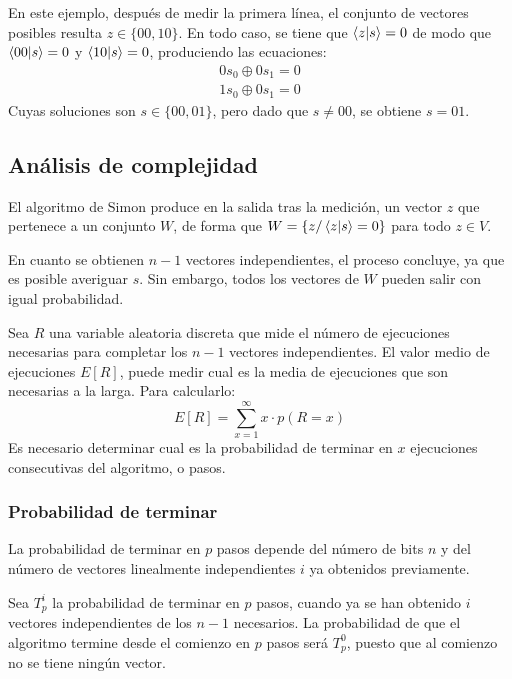 En este ejemplo, después de medir la primera línea, el conjunto de vectores 
posibles resulta $z \in \{00, 10\}$. En todo caso, se tiene que $\braket{z|s} = 
0$ de modo que $\braket{00|s} = 0$ y $\braket{10|s} = 0$, produciendo las 
ecuaciones:
%
\begin{equation}
\begin{split}
	0 s_0 \oplus 0 s_1 = 0 \\
	1 s_0 \oplus 0 s_1 = 0
\end{split}
\end{equation}
%
Cuyas soluciones son $s \in \{00, 01\}$, pero dado que $s \neq 00$, se obtiene 
$s = 01$.

\subsection{Análisis de complejidad}

El algoritmo de Simon produce en la salida tras la medición, un vector $z$ que 
pertenece a un conjunto $W$, de forma que $W = \{z / \braket{z|s} = 0\}$ para 
todo $z \in V$.

En cuanto se obtienen $n-1$ vectores independientes, el proceso concluye, ya que 
es posible averiguar $s$. Sin embargo, todos los vectores de $W$ pueden salir 
con igual probabilidad.

Sea $R$ una variable aleatoria discreta que mide el número de ejecuciones 
necesarias para completar los $n-1$ vectores independientes. El valor medio de 
ejecuciones $E[R]$, puede medir cual es la media de ejecuciones que son 
necesarias a la larga. Para calcularlo:
%
$$ E[R] = \sum^{\infty}_{x=1} x \cdot p(R=x) $$
%
Es necesario determinar cual es la probabilidad de terminar en $x$ ejecuciones 
consecutivas del algoritmo, o pasos.

\subsubsection{Probabilidad de terminar}

La probabilidad de terminar en $p$ pasos depende del número de bits $n$ y del 
número de vectores linealmente independientes $i$ ya obtenidos previamente.  

Sea $T^i_p$ la probabilidad de terminar en $p$ pasos, cuando ya se han obtenido 
$i$ vectores independientes de los $n-1$ necesarios. La probabilidad de que el 
algoritmo termine desde el comienzo en $p$ pasos será $T^0_p$, puesto que al 
comienzo no se tiene ningún vector.

